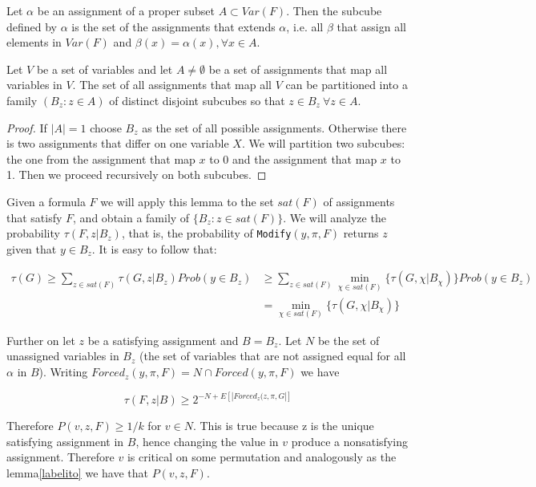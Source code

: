 \begin{definition}

  Let $\alpha$ be an assignment of a proper subset $A \subset Var(F)$. Then the subcube defined by $\alpha$ is the set of the assignments that extends $\alpha$, i.e. all $\beta$ that assign all elements in $Var(F)$ and $\beta(x)=\alpha(x), \forall x \in A$.
\end{definition}

\begin{lemma}
  Let $V$ be a set of variables and let $A\ne \emptyset$ be a set of assignments that map all variables in $V$. The set of all assignments that map all $V$ can be partitioned into a family $(B_z : z \in A)$ of distinct disjoint subcubes so that $z \in B_z \ \forall z \in A$.
\end{lemma}

\begin{proof}
  If $|A|=1$ choose $B_z$ as the set of all possible assignments. Otherwise there is two assignments that differ on one variable $X$. We will partition two subcubes: the one from the assignment that map $x$ to 0 and the assignment that map $x$ to 1. Then we proceed recursively on both subcubes.
\end{proof}


Given a formula $F$ we will apply this lemma to the set $sat(F)$ of assignments that satisfy $F$, and obtain a family of $\{B_z : z \in sat(F)\}$. We will analyze the probability $\tau(F, z | B_z)$, that is, the probability of \texttt{Modify}$(y, \pi, F)$ returns $z$ given that $y \in B_z$. It is easy to follow that:



\begin{align*}
  \tau(G) \ge \sum_{z\in sat(F)}  \tau(G, z | B_z) Prob(y \in B_z)  &\ge  \sum_{z\in sat(F)} \min_{\chi \in sat(F)} \{\tau(G, \chi | B_\chi)\}  Prob(y \in B_z)\\ & = \min_{\chi \in sat(F)} \{\tau(G, \chi | B_\chi)\}
\end{align*}


Further on let $z$ be a satisfying assignment and $B = B_z$. Let $N$ be the set of unassigned variables in $B_z$ (the set of variables that are not assigned equal for all $\alpha$ in $B$). Writing $Forced_z (y,\pi,F) = N \cap Forced(y,\pi,F)$  we have

$$\tau(F, z | B) \ge 2^{-N + E[|Forced_z(z, \pi, G|]}$$

Therefore $P(v,z,F) \ge 1/k$ for $v\in N$. This is true because z is the unique satisfying assignment in $B$, hence changing the value in $v$ produce a nonsatisfying assignment. Therefore $v$ is critical on some permutation and analogously as the lemma\ref{labelito} we have that $P(v,z,F)$.

